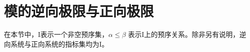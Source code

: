 \section{模的逆向极限与正向极限}

在本节中，I表示一个非空预序集，\(\alpha \leqslant \beta\) 表示I上的预序关系。除非另有说明，逆向系统与正向系统的指标集均为I。

